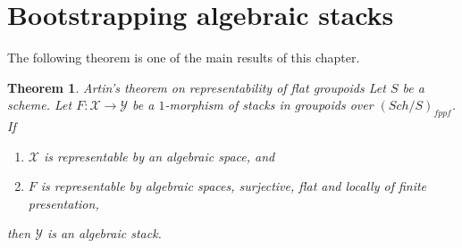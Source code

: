 \documentclass{stacks-project}
\newenvironment{slogan}{\comment}{\endcomment}
\theoremstyle{plain}
\newtheorem{theorem}[subsection]{Theorem}
\theoremstyle{definition}
\theoremstyle{remark}
\numberwithin{equation}{subsection}
\def\Sch{\mathit{Sch}}
\begin{document}
\section{Bootstrapping algebraic stacks}
\label{section-bootstrap}

\noindent
The following theorem is one of the main results of this chapter.

\begin{theorem}
\label{theorem-bootstrap}
\begin{slogan}
Artin's theorem on representability of flat groupoids
\end{slogan}
Let $S$ be a scheme. Let $F : \mathcal{X} \to \mathcal{Y}$
be a $1$-morphism of stacks in groupoids over $(\Sch/S)_{fppf}$. If
\begin{enumerate}
\item $\mathcal{X}$ is representable by an algebraic space, and
\item $F$ is representable by algebraic spaces, surjective, flat and
locally of finite presentation,
\end{enumerate}
then $\mathcal{Y}$ is an algebraic stack.
\end{theorem}
\end{document}
